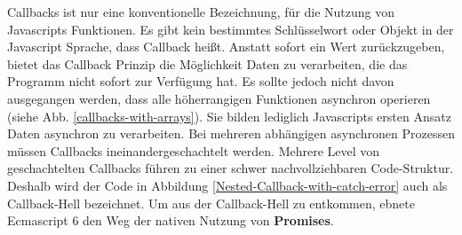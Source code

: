 \noindent
Callbacks ist nur eine konventionelle Bezeichnung, für die Nutzung von Javascripts Funktionen. Es gibt kein bestimmtes Schlüsselwort oder Objekt in der Javascript Sprache, dass Callback heißt. Anstatt sofort ein Wert zurückzugeben, bietet das Callback Prinzip die Möglichkeit Daten zu verarbeiten, die das Programm nicht sofort zur Verfügung hat. Es sollte jedoch nicht davon ausgegangen werden, dass alle höherrangigen Funktionen asynchron operieren (siehe Abb. \ref{callbacks-with-arrays}). Sie bilden lediglich Javascripts ersten Ansatz Daten asynchron zu verarbeiten. Bei mehreren abhängigen asynchronen Prozessen müssen Callbacks ineinandergeschachtelt werden. Mehrere Level von geschachtelten Callbacks führen zu einer schwer nachvollziehbaren Code-Struktur. Deshalb wird der Code in Abbildung \ref{Nested-Callback-with-catch-error} auch als \glqq{}Callback-Hell\grqq{} bezeichnet. Um aus der Callback-Hell zu entkommen, ebnete Ecmascript 6 den Weg der nativen Nutzung von \textbf{Promises}.



